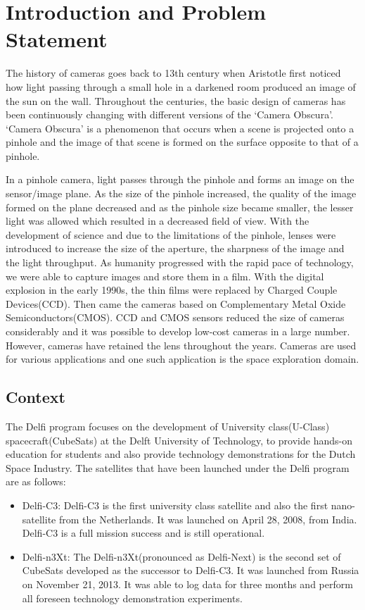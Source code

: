 \chapter{Introduction and Problem Statement}
\label{chp:introduction}
The history of cameras goes back to 13th century when Aristotle first noticed how light passing through a small hole in a darkened room produced an image of the sun on the wall. Throughout the centuries, the basic design of cameras has been continuously changing with different versions of the `Camera Obscura'. `Camera Obscura' is a phenomenon that occurs when a scene is projected onto a pinhole and the image of that scene is formed on the surface opposite to that of a pinhole. 

In a pinhole camera, light passes through the pinhole and forms an image on the sensor/image plane. As the size of the pinhole increased, the quality of the image formed on the plane decreased and as the pinhole size became smaller, the lesser light was allowed which resulted in a decreased field of view. With the development of science and due to the limitations of the pinhole, lenses were introduced to increase the size of the aperture, the sharpness of the image and the light throughput. As humanity progressed with the rapid pace of technology, we were able to capture images and store them in a film. With the digital explosion in the early 1990s, the thin films were replaced by Charged Couple Devices(CCD). Then came the cameras based on Complementary Metal Oxide Semiconductors(CMOS). CCD and CMOS sensors reduced the size of cameras considerably and it was possible to develop low-cost cameras in a large number. However, cameras have retained the lens throughout the years. Cameras are used for various applications and one such application is the space exploration domain. 

\section{Context}
The Delfi program focuses on the development of University class(U-Class) spacecraft(CubeSats) at the Delft University of Technology, to provide hands-on education for students and also provide technology demonstrations for the Dutch Space Industry. The satellites that have been launched under the Delfi program are as follows:
\begin{itemize}
\item Delfi-C3: Delfi-C3 is the first university class satellite and also the first nano-satellite from the Netherlands. It was launched on April 28, 2008, from India. Delfi-C3 is a full mission success and is still operational\cite{DelfiC3}.
\item Delfi-n3Xt: The Delfi-n3Xt(pronounced as Delfi-Next) is the second set of CubeSats developed as the successor to Delfi-C3. It was launched from Russia on November 21, 2013. It was able to log data for three months and perform all foreseen technology demonstration experiments.
\end{itemize}

